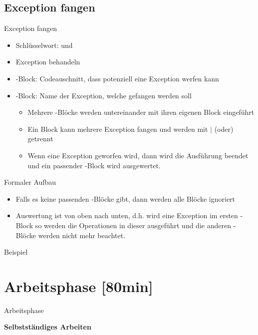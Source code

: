 \documentclass{../tuda-beamer}
\begin{document}
    \subsection{Exception fangen}
    \label{subsec:exception-fangen}
    \begin{frame}[c]{Exception fangen}
        \begin{itemize}
            \item Schlüsselwort:  und 
            \item Exception behandeln
            \item {}-Block: Codeauschnitt, dass potenziell eine Exception werfen kann
            \item {}-Block: Name der Exception, welche gefangen werden soll

            \begin{itemize}
                \item Mehrere -Blöcke werden untereinander mit ihren eigenen
                Block eingeführt
                \item Ein Block kann mehrere Exception fangen und werden mit \(\vert\) (oder)
                getrennt
                \item Wenn eine Exception geworfen wird, dann wird die Ausführung beendet und ein
                passender -Block wird ausgewertet.
            \end{itemize}
        \end{itemize}
    \end{frame}

    \begin{frame}[c]{Formaler Aufbau}
        \begin{itemize}
            \item Falls es keine passenden -Blöcke gibt, dann werden alle
            Blöcke ignoriert
            \item Auswertung ist von oben nach unten, d.h. wird eine Exception im ersten
            -Block so werden die Operationen in dieser ausgeführt und die
            anderen -Blöcke werden nicht mehr beachtet.
        \end{itemize}
        
    \end{frame}

    \begin{frame}[c]{Beispiel}
        
    \end{frame}


    \section{Arbeitsphase [80min]}
    \label{sec:arbeitsphase}
    \begin{frame}[c]{Arbeitsphase}
        \begin{center}
            \textbf{\LARGE Selbstständiges Arbeiten}
        \end{center}
    \end{frame}
\end{document}

